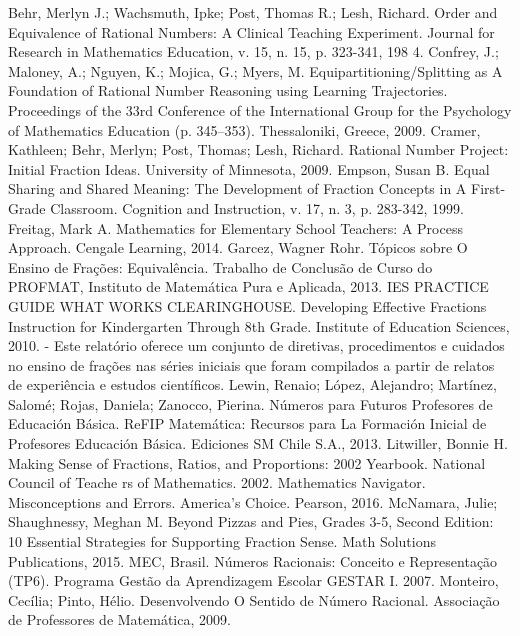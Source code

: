 
\begin{thebibliography}{9}
 Behr, Merlyn J.; Wachsmuth, Ipke; Post, Thomas R.; Lesh, Richard. Order and Equivalence of Rational Numbers: A Clinical Teaching Experiment. Journal for Research in Mathematics Education, v. 15, n. 15, p. 323-341, 198 4.
   Confrey, J.; Maloney, A.; Nguyen, K.; Mojica, G.; Myers, M. Equipartitioning/Splitting as A Foundation of Rational Number Reasoning using Learning Trajectories. Proceedings of the 33rd Conference of the International Group for the Psychology of Mathematics Education (p. 345–353). Thessaloniki, Greece, 2009.
     Cramer, Kathleen; Behr, Merlyn; Post, Thomas; Lesh, Richard. Rational Number Project: Initial Fraction Ideas. University of Minnesota, 2009.
     Empson, Susan B. Equal Sharing and Shared Meaning: The Development of Fraction Concepts in A First-Grade Classroom. Cognition and Instruction, v. 17, n. 3, p. 283-342, 1999.
     Freitag, Mark A. Mathematics for Elementary School Teachers: A Process Approach. Cengale Learning, 2014.
     Garcez, Wagner Rohr. Tópicos sobre O Ensino de Frações: Equivalência. Trabalho de Conclusão de Curso do PROFMAT, Instituto de Matemática Pura e Aplicada, 2013.
     IES PRACTICE GUIDE WHAT WORKS CLEARINGHOUSE. Developing Effective Fractions Instruction for Kindergarten Through 8th Grade. Institute of Education Sciences, 2010. - Este relatório oferece um conjunto de diretivas, procedimentos e cuidados no ensino de frações nas séries iniciais que foram compilados a partir de relatos de experiência e estudos científicos.
     Lewin, Renaio; López, Alejandro; Martínez, Salomé; Rojas, Daniela; Zanocco, Pierina. Números para Futuros Profesores de Educación Básica. ReFIP Matemática: Recursos para La Formación Inicial de Profesores Educación Básica. Ediciones SM Chile S.A., 2013.
     Litwiller, Bonnie H. Making Sense of Fractions, Ratios, and Proportions: 2002 Yearbook. National Council of Teache rs of Mathematics. 2002.
     Mathematics Navigator. Misconceptions and Errors. America's Choice. Pearson, 2016.
     McNamara, Julie; Shaughnessy, Meghan M. Beyond Pizzas and Pies, Grades 3-5, Second Edition: 10 Essential Strategies for Supporting Fraction Sense. Math Solutions Publications, 2015.
     MEC, Brasil. Números Racionais: Conceito e Representação (TP6). Programa Gestão da Aprendizagem Escolar GESTAR I. 2007.
    Monteiro, Cecília; Pinto, Hélio. Desenvolvendo O Sentido de Número Racional. Associação de Professores de Matemática, 2009.

\end{thebibliography}
